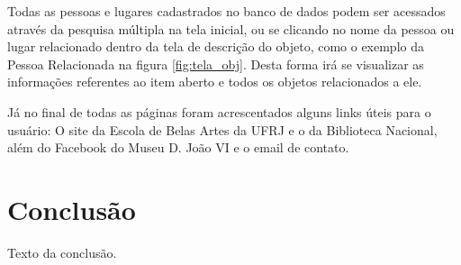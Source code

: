 \documentclass[a4paper,12pt,oneside,onecolumn,final,fleqn]{repUERJ}
\begin{document}
Todas as pessoas e lugares cadastrados no banco de dados podem ser acessados através da pesquisa múltipla na tela inicial, ou se clicando no nome da pessoa ou lugar relacionado dentro da tela de descrição do objeto, como o exemplo da Pessoa Relacionada na figura \ref{fig:tela_obj}. Desta forma irá se visualizar as informações referentes ao item aberto e todos os objetos relacionados a ele.

Já no final de todas as páginas foram acrescentados alguns links úteis para o usuário: O site da Escola de Belas Artes da UFRJ e o da Biblioteca Nacional, além do Facebook do Museu D. João VI e o email de contato.

\chapter*{Conclusão}

Texto da conclusão.


\backmatter %






\appendix %





\end{document}
